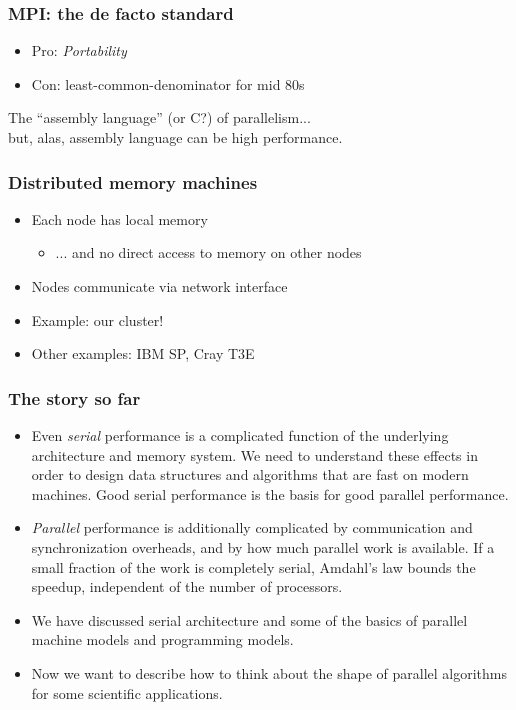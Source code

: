 \documentclass{beamer}
\begin{document}
\begin{frame}
  \frametitle{MPI: the de facto standard}

  \begin{itemize}
  \item Pro: {\em Portability}
  \item Con: least-common-denominator for mid 80s
  \end{itemize}
  The ``assembly language'' (or C?) of parallelism... \\
  \hspace{5mm} but, alas, assembly language can be high performance.

\end{frame}


\begin{frame}
  \frametitle{Distributed memory machines}
  
  \begin{itemize}
  \item Each node has local memory
    \begin{itemize}
    \item ... and no direct access to memory on other nodes
    \end{itemize}
  \item Nodes communicate via network interface
  \item Example: our cluster!
  \item Other examples: IBM SP, Cray T3E
  \end{itemize}
\end{frame}

\begin{frame}
  \frametitle{The story so far}

  \begin{itemize}
  \item Even {\em serial} performance is a complicated function of
        the underlying architecture and memory system.  We need to
        understand these effects in order to design data structures
        and algorithms that are fast on modern machines.  Good
        serial performance is the basis for good parallel performance.
  \item {\em Parallel} performance is additionally complicated by
        communication and synchronization overheads, and by how
        much parallel work is available.  If a small fraction of the
        work is completely serial, Amdahl's law bounds the speedup,
        independent of the number of processors.
  \item We have discussed serial architecture and some of the basics
        of parallel machine models and programming models.
  \item Now we want to describe how to think about the shape of
        parallel algorithms for some scientific applications.
  \end{itemize}
\end{frame}
\end{document}
